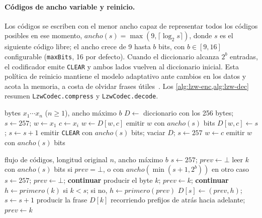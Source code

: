 \paragraph{Códigos de ancho variable y reinicio.} Los códigos se escriben con el menor ancho
capaz de representar todos los códigos posibles en ese momento,
$\mathit{ancho}(s) = \max\left(9, \lceil\log_2 s\rceil\right)$, donde $s$ es el siguiente
código libre; el ancho crece de 9 hasta $b$ bits, con $b \in [9, 16]$ configurable
(\texttt{maxBits}, 16 por defecto). Cuando el diccionario alcanza $2^b$ entradas, el
codificador emite \texttt{CLEAR} y ambos lados vuelven al diccionario inicial. Esta política
de reinicio mantiene el modelo adaptativo ante cambios en los datos y acota la memoria, a costa
de olvidar frases útiles~\cite{cheng2021}. Los \cref{alg:lzw-enc,alg:lzw-dec} resumen
\texttt{LzwCodec.compress} y \texttt{LzwCodec.decode}.

\begin{algorithm}[H]
  \caption{Codificación LZW con reinicio (\texttt{compress}).}
  \label{alg:lzw-enc}
  \small
  \begin{algorithmic}[1]
    \Require bytes $x_1\cdots x_n$ ($n \ge 1$), ancho máximo $b$
    \State $D \gets$ diccionario con los 256 bytes;\; $s \gets 257$;\; $w \gets x_1$
      \State $c \gets x_i$
        \State $w \gets D[w, c]$ 
      \Else
        \State emitir $w$ con $\mathit{ancho}(s)$ bits
          \State $D[w, c] \gets s$;\; $s \gets s + 1$
        \Else
          \State emitir \texttt{CLEAR} con $\mathit{ancho}(s)$ bits;\; vaciar $D$;\; $s \gets 257$
        \EndIf
        \State $w \gets c$
      \EndIf
    \EndFor
    \State emitir $w$ con $\mathit{ancho}(s)$ bits
  \end{algorithmic}
\end{algorithm}

\begin{algorithm}[H]
  \caption{Decodificación LZW (\texttt{decode}).}
  \label{alg:lzw-dec}
  \small
  \begin{algorithmic}[1]
    \Require flujo de códigos, longitud original $n$, ancho máximo $b$
    \State $s \gets 257$;\; $\mathit{prev} \gets \bot$
      \State leer $k$ con $\mathit{ancho}(s)$ bits si $\mathit{prev} = \bot$, o con
             $\mathit{ancho}(\min(s + 1, 2^b))$ en otro caso
       \State $s \gets 257$;\; $\mathit{prev} \gets \bot$;\; \textbf{continuar} \EndIf
       \State producir el byte $k$;\; $\mathit{prev} \gets k$;\; \textbf{continuar} \EndIf
        \State $h \gets \mathit{primero}(k)$ si $k < s$; si no, $h \gets \mathit{primero}(\mathit{prev})$ 
        \State $D[s] \gets (\mathit{prev}, h)$;\; $s \gets s + 1$
      \EndIf
      \State producir la frase $D[k]$ recorriendo prefijos de atrás hacia adelante;\; $\mathit{prev} \gets k$
    \EndWhile
  \end{algorithmic}
\end{algorithm}

